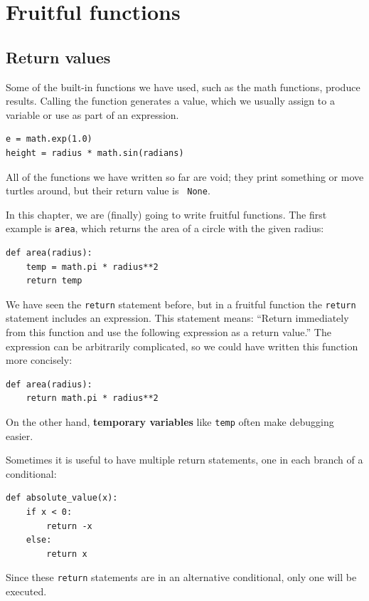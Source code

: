 \documentclass[10pt]{book}
\begin{document}
\chapter{Fruitful functions}
\label{fruitchap}

\section{Return values}

Some of the built-in functions we have used, such as the math
functions, produce results.  Calling the function generates a
value, which we usually assign to a variable or use as part of an
expression.

\begin{verbatim}
e = math.exp(1.0)
height = radius * math.sin(radians)
\end{verbatim}
%
All of the functions we have written so far are void; they print
something or move turtles around, but their return value is {\tt
None}.

In this chapter, we are (finally) going to write fruitful functions.
The first example is {\tt area}, which returns the area of a circle
with the given radius:

\begin{verbatim}
def area(radius):
    temp = math.pi * radius**2
    return temp
\end{verbatim}
%
We have seen the {\tt return} statement before, but in a fruitful
function the {\tt return} statement includes
an expression.  This statement means: ``Return immediately from
this function and use the following expression as a return value.''
The expression can be arbitrarily complicated, so we could
have written this function more concisely:

\begin{verbatim}
def area(radius):
    return math.pi * radius**2
\end{verbatim}
%
On the other hand, {\bf temporary variables} like {\tt temp} often make
debugging easier.

Sometimes it is useful to have multiple return statements, one in each
branch of a conditional:

\begin{verbatim}
def absolute_value(x):
    if x < 0:
        return -x
    else:
        return x
\end{verbatim}
%
Since these {\tt return} statements are in an alternative conditional,
only one will be executed.
\end{document}
